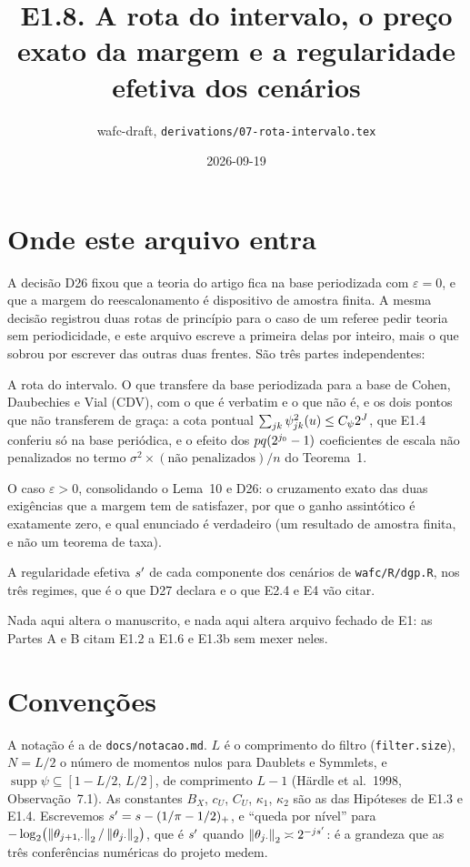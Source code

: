 \documentclass[11pt,a4paper]{article}
\title{E1.8. A rota do intervalo, o preço exato da margem e a regularidade
efetiva dos cenários}
\author{wafc-draft, \texttt{derivations/07-rota-intervalo.tex}}
\date{2026-09-19}
\newcommand{\eps}{\varepsilon}
\begin{document}
\maketitle

\section*{Onde este arquivo entra}

A decisão D26 fixou que a teoria do artigo fica na base periodizada com
$\eps = 0$, e que a margem do reescalonamento é dispositivo de amostra
finita. A mesma decisão registrou duas rotas de princípio para o caso de um
referee pedir teoria sem periodicidade, e este arquivo escreve a primeira
delas por inteiro, mais o que sobrou por escrever das outras duas frentes.
São três partes independentes:

\begin{description}[nosep]
  \item[Parte A.] A rota do intervalo. O que transfere da base periodizada
    para a base de Cohen, Daubechies e Vial (CDV), com o que é verbatim e o
    que não é, e os dois pontos que não transferem de graça: a cota pontual
    $\sum_{jk}\psi_{jk}^{2}(u) \le C_{\psi}2^{J}$, que E1.4
    conferiu só na base periódica, e o efeito dos $pq(2^{j_{0}}-1)$
    coeficientes de escala não penalizados no termo
    $\sigma^{2}\times(\text{não penalizados})/n$ do Teorema~1.
  \item[Parte B.] O caso $\eps > 0$, consolidando o Lema~10 e D26: o
    cruzamento exato das duas exigências que a margem tem de satisfazer, por
    que o ganho assintótico é exatamente zero, e qual enunciado é verdadeiro
    (um resultado de amostra finita, e não um teorema de taxa).
  \item[Parte C.] A regularidade efetiva $s'$ de cada componente dos
    cenários de \texttt{wafc/R/dgp.R}, nos três regimes, que é o que D27
    declara e o que E2.4 e E4 vão citar.
\end{description}

Nada aqui altera o manuscrito, e nada aqui altera arquivo fechado de E1: as
Partes A e B citam E1.2 a E1.6 e E1.3b sem mexer neles.

\section*{Convenções}

A notação é a de \texttt{docs/notacao.md}. $L$ é o comprimento do filtro
(\texttt{filter.size}), $N = L/2$ o número de momentos nulos para Daublets e
Symmlets, e $\operatorname{supp}\psi \subseteq [1 - L/2,\, L/2]$, de
comprimento $L-1$ (Härdle et al.\ 1998, Observação~7.1). As constantes
$B_{X}$, $c_{U}$, $C_{U}$, $\kappa_{1}$, $\kappa_{2}$ são as das Hipóteses de
E1.3 e E1.4. Escrevemos $s' = s - (1/\pi - 1/2)_{+}$, e ``queda por
nível'' para $-\log_{2}\bigl(\left\lVert \theta_{j+1,\cdot} \right\rVert_{2} /
\left\lVert \theta_{j\cdot} \right\rVert_{2}\bigr)$, que é $s'$ quando
$\left\lVert \theta_{j\cdot} \right\rVert_{2} \asymp 2^{-js'}$: é a grandeza que as
três conferências numéricas do projeto medem.
\end{document}
